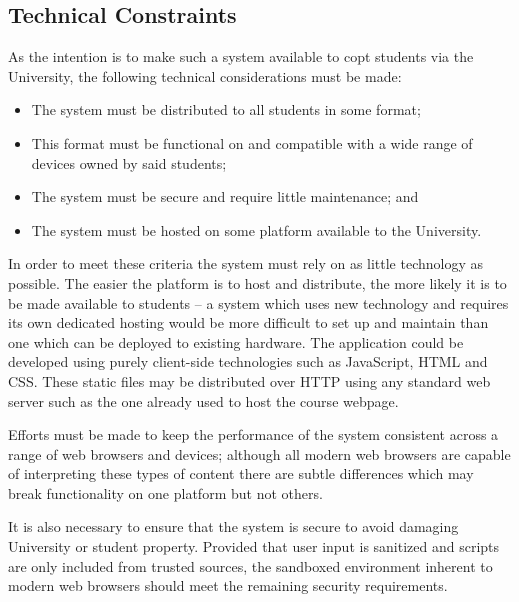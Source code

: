 \documentclass[bsc,twoside,singlespacing,parskip,logo,notimes,normalheadings]{infthesis}
\begin{document}
        \subsection{Technical Constraints}
        As the intention is to make such a system available to
        \gls{copt} students via the University, the following
        technical considerations must be made:

        \begin{itemize}
        \item The system must be distributed to all students in some
          format;
        \item This format must be functional on and compatible with a
          wide range of devices owned by said students;
        \item The system must be secure and require little
          maintenance; and
        \item The system must be hosted on some platform available to
          the University.
        \end{itemize}

        In order to meet these criteria the system must rely on as
        little technology as possible. The easier the platform is to
        host and distribute, the more likely it is to be made
        available to students -- a system which uses new technology
        and requires its own dedicated hosting would be more difficult
        to set up and maintain than one which can be deployed to
        existing hardware. The application could be developed using
        purely client-side technologies such as JavaScript, HTML and
        CSS. These static files may be distributed over HTTP using any
        standard web server such as the one already used to host the
        course webpage.

        Efforts must be made to keep the performance of the system
        consistent across a range of web browsers and devices;
        although all modern web browsers are capable of interpreting
        these types of content there are subtle differences which may
        break functionality on one platform but not others.

        It is also necessary to ensure that the system is secure to
        avoid damaging University or student property. Provided that
        user input is sanitized and scripts are only included from
        trusted sources, the sandboxed environment inherent to modern
        web browsers should meet the remaining security requirements.
\end{document}

